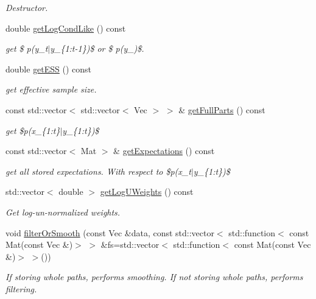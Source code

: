 \begin{DoxyCompactItemize}
\begin{DoxyCompactList}\small\item\em Destructor. \end{DoxyCompactList}\item 
double \hyperlink{classSISRFilter_a9bec319e692266cacdd7e6cd9b60e77d}{get\+Log\+Cond\+Like} () const 
\begin{DoxyCompactList}\small\item\em get \$ p(y\+\_\+t$\vert$y\+\_\+\{1\+:t-\/1\})\$ or \$ p(y\+\_)\$. \end{DoxyCompactList}\item 
double \hyperlink{classSISRFilter_aab226ed51d07c493151a6788e6f90b86}{get\+E\+SS} () const 
\begin{DoxyCompactList}\small\item\em get effective sample size. \end{DoxyCompactList}\item 
const std\+::vector$<$ std\+::vector$<$ Vec $>$ $>$ \& \hyperlink{classSISRFilter_abf2a3eb798a56e83a5a87db40b2594c4}{get\+Full\+Parts} () const 
\begin{DoxyCompactList}\small\item\em get \$p(x\+\_\+\{1\+:t\}$\vert$y\+\_\+\{1\+:t\})\$ \end{DoxyCompactList}\item 
const std\+::vector$<$ Mat $>$ \& \hyperlink{classSISRFilter_af21ae70333a86a3796b3bc5a83a985a3}{get\+Expectations} () const 
\begin{DoxyCompactList}\small\item\em get all stored expectations. With respect to \$p(x\+\_\+t$\vert$y\+\_\+\{1\+:t\})\$ \end{DoxyCompactList}\item 
std\+::vector$<$ double $>$ \hyperlink{classSISRFilter_aa87ac349cbc21f70fb51c24fcbbc521a}{get\+Log\+U\+Weights} () const 
\begin{DoxyCompactList}\small\item\em Get log-\/un-\/normalized weights. \end{DoxyCompactList}\item 
void \hyperlink{classSISRFilter_a8c22a038dc47490b5532f2ec6c21a548}{filter\+Or\+Smooth} (const Vec \&data, const std\+::vector$<$ std\+::function$<$ const Mat(const Vec \&)$>$ $>$ \&fs=std\+::vector$<$ std\+::function$<$ const Mat(const Vec \&)$>$ $>$())
\begin{DoxyCompactList}\small\item\em If storing whole paths, performs smoothing. If not storing whole paths, performs filtering. \end{DoxyCompactList}\item 

\end{DoxyCompactItemize}
